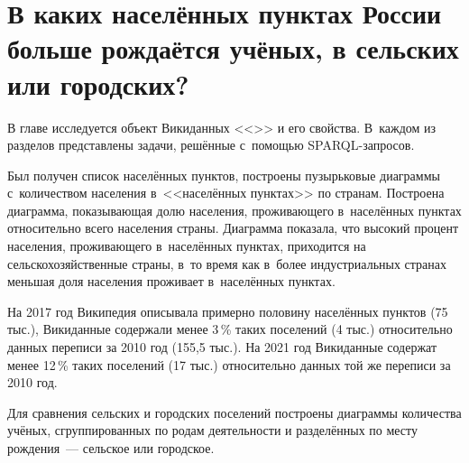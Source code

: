 \chapter[В каких населённых пунктах России больше рождаётся учёных, в сельских или городских?]
{В каких населённых пунктах России больше рождаётся учёных,\newline 
\hspace*{20pt}в сельских или городских?}
\label{ch:human-settlement}

В главе исследуется объект Викиданных <<>> и его свойства. 
В~каждом из разделов представлены задачи, решённые с~помощью SPARQL-запросов. 
%

Был получен список населённых пунктов, 
построены пузырьковые диаграммы с~количеством населения в~<<населённых пунктах>> по странам. 
Построена диаграмма, показывающая долю населения, 
проживающего в~населённых пунктах относительно всего населения страны. 
Диаграмма показала, что высокий процент населения, проживающего в~населённых пунктах, 
приходится на сельскохозяйственные страны, в~то время как в~более индустриальных странах 
меньшая доля населения проживает в~населённых пунктах. 
%

На 2017 год Википедия описывала примерно половину населённых пунктов (75 тыс.), 
Викиданные содержали менее 3\,\% таких поселений (4 тыс.) относительно данных переписи за 2010 год (155,5 тыс.). 
На 2021 год Викиданные содержат менее 12\,\% таких поселений (17 тыс.) 
относительно данных той же переписи за 2010 год. 

Для сравнения сельских и городских поселений 
построены диаграммы количества учёных, сгруппированных по родам деятельности 
и разделённых по месту рождения~--- сельское или городское.

